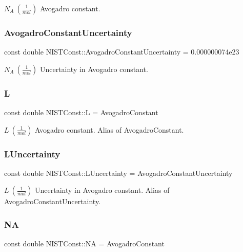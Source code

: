 $N_A \ (\frac{1}{mol})$ Avogadro constant. \mbox{\label{group___avogadro_constant_ga38f3e71e31d844bbfe2dfacf7100c4d1}} 
\subsubsection{\texorpdfstring{Avogadro\+Constant\+Uncertainty}{AvogadroConstantUncertainty}}
{\footnotesize\ttfamily const double N\+I\+S\+T\+Const\+::\+Avogadro\+Constant\+Uncertainty = 0.\+000000074e23}

$N_A \ (\frac{1}{mol})$ Uncertainty in Avogadro constant. \mbox{\label{group___avogadro_constant_ga0d410e47da7c9d6841958899d80e4b75}} 
\subsubsection{\texorpdfstring{L}{L}}
{\footnotesize\ttfamily const double N\+I\+S\+T\+Const\+::L = Avogadro\+Constant}

$L \ (\frac{1}{mol})$ Avogadro constant. Alias of Avogadro\+Constant. \mbox{\label{group___avogadro_constant_ga76105d1e09dbaed0913932aa743ef03d}} 
\subsubsection{\texorpdfstring{L\+Uncertainty}{LUncertainty}}
{\footnotesize\ttfamily const double N\+I\+S\+T\+Const\+::\+L\+Uncertainty = Avogadro\+Constant\+Uncertainty}

$L \ (\frac{1}{mol})$ Uncertainty in Avogadro constant. Alias of Avogadro\+Constant\+Uncertainty. \mbox{\label{group___avogadro_constant_gad08af58ac1b1ee41e25bd8564a74bc42}} 
\subsubsection{\texorpdfstring{NA}{NA}}
{\footnotesize\ttfamily const double N\+I\+S\+T\+Const\+::\+NA = Avogadro\+Constant}

